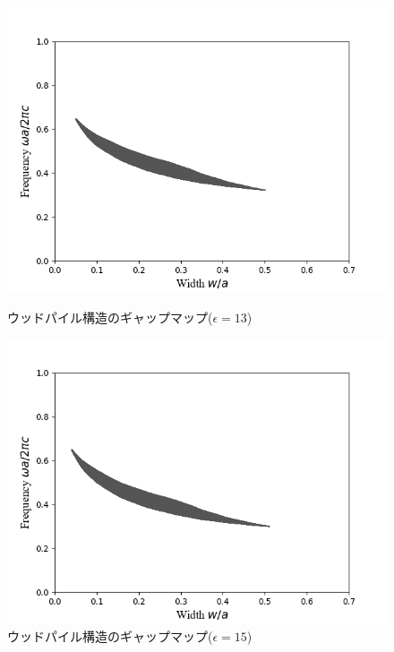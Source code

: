 \documentclass[platex,dvipdfmx]{jsreport}
\numberwithin{equation}{section}
\begin{document}
\begin{figure}[h]
  \begin{minipage}[h]{0.5\linewidth}
    \centering
    \includegraphics[keepaspectratio, scale=0.45]{results/gap_map/woodpile-2_e-13.png}
    \caption{ウッドパイル構造のギャップマップ($\epsilon = 13$)}
    \label{fig:gapmap_woodpile_e-13}
  \end{minipage}
  \begin{minipage}[h]{0.5\linewidth}
    \centering
    \includegraphics[keepaspectratio, scale=0.45]{results/gap_map/woodpile-2_e-15.png}
    \caption{ウッドパイル構造のギャップマップ($\epsilon = 15$)}
    \label{fig:gapmap_woodpile_e-15}
  \end{minipage}
\end{figure}
\end{document}

